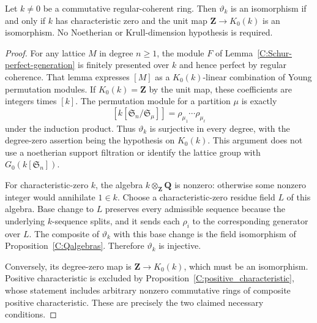 \begin{theorem}
\label{C:regular-coherent-criterion}
Let $k\ne0$ be a commutative regular-coherent ring.
Then $\vartheta_k$ is an isomorphism if and only if $k$ has
characteristic zero and the unit map
$\mathbf Z\longrightarrow K_0(k)$ is an isomorphism.
No Noetherian or Krull-dimension hypothesis is required.
\end{theorem}
\begin{proof}
For any lattice $M$ in degree $n\geq1$, the module $F$ of
Lemma~\ref{C:Schur-perfect-generation} is finitely presented
over $k$ and hence perfect by regular coherence.
That lemma expresses $[M]$ as a $K_0(k)$-linear combination
of Young permutation modules.
If $K_0(k)=\mathbf Z$ by the unit map, these coefficients
are integers times $[k]$.
The permutation module for a partition $\mu$ is exactly
\[
 [k[\mathfrak S_n/\mathfrak S_\mu]]
       =\rho_{\mu_1}\cdots\rho_{\mu_\ell}
\]
under the induction product.  Thus $\vartheta_k$ is
surjective in every degree, with the degree-zero assertion
being the hypothesis on $K_0(k)$.
This argument does not use a noetherian support filtration
or identify the lattice group with $G_0(k[\mathfrak S_n])$.

For characteristic-zero $k$, the algebra
$k\otimes_{\mathbf Z}\mathbf Q$ is nonzero: otherwise some
nonzero integer would annihilate $1\in k$.
Choose a characteristic-zero residue field $L$ of this algebra.
Base change to $L$ preserves every admissible sequence
because the underlying $k$-sequence splits, and it sends
each $\rho_i$ to the corresponding generator over $L$.
The composite of $\vartheta_k$ with this base change is
the field isomorphism of Proposition~\ref{C:Qalgebras}.
Therefore $\vartheta_k$ is injective.

Conversely, its degree-zero map is
$\mathbf Z\to K_0(k)$, which must be an isomorphism.
Positive characteristic is excluded by
Proposition~\ref{C:positive_characteristic}, whose statement
includes arbitrary nonzero commutative rings of composite
positive characteristic.  These are precisely the two
claimed necessary conditions.
\end{proof}

